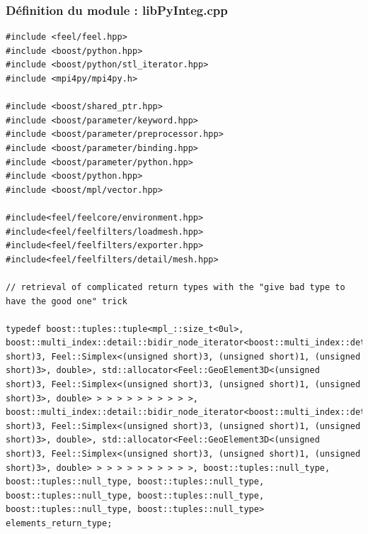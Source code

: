 \documentclass[french,12pt]{article}
\begin{document}
\subsubsection{Définition du module : libPyInteg.cpp}
\begin{lstlisting}
#include <feel/feel.hpp>
#include <boost/python.hpp>
#include <boost/python/stl_iterator.hpp>
#include <mpi4py/mpi4py.h>

#include <boost/shared_ptr.hpp>
#include <boost/parameter/keyword.hpp>
#include <boost/parameter/preprocessor.hpp>
#include <boost/parameter/binding.hpp>
#include <boost/parameter/python.hpp>
#include <boost/python.hpp>
#include <boost/mpl/vector.hpp>

#include<feel/feelcore/environment.hpp>
#include<feel/feelfilters/loadmesh.hpp>
#include<feel/feelfilters/exporter.hpp>
#include<feel/feelfilters/detail/mesh.hpp>

// retrieval of complicated return types with the "give bad type to have the good one" trick  

typedef boost::tuples::tuple<mpl_::size_t<0ul>, boost::multi_index::detail::bidir_node_iterator<boost::multi_index::detail::ordered_index_node<boost::multi_index::detail::ordered_index_node<boost::multi_index::detail::ordered_index_node<boost::multi_index::detail::ordered_index_node<boost::multi_index::detail::ordered_index_node<boost::multi_index::detail::ordered_index_node<boost::multi_index::detail::ordered_index_node<boost::multi_index::detail::index_node_base<Feel::GeoElement3D<(unsigned short)3, Feel::Simplex<(unsigned short)3, (unsigned short)1, (unsigned short)3>, double>, std::allocator<Feel::GeoElement3D<(unsigned short)3, Feel::Simplex<(unsigned short)3, (unsigned short)1, (unsigned short)3>, double> > > > > > > > > > >, boost::multi_index::detail::bidir_node_iterator<boost::multi_index::detail::ordered_index_node<boost::multi_index::detail::ordered_index_node<boost::multi_index::detail::ordered_index_node<boost::multi_index::detail::ordered_index_node<boost::multi_index::detail::ordered_index_node<boost::multi_index::detail::ordered_index_node<boost::multi_index::detail::ordered_index_node<boost::multi_index::detail::index_node_base<Feel::GeoElement3D<(unsigned short)3, Feel::Simplex<(unsigned short)3, (unsigned short)1, (unsigned short)3>, double>, std::allocator<Feel::GeoElement3D<(unsigned short)3, Feel::Simplex<(unsigned short)3, (unsigned short)1, (unsigned short)3>, double> > > > > > > > > > >, boost::tuples::null_type, boost::tuples::null_type, boost::tuples::null_type, boost::tuples::null_type, boost::tuples::null_type, boost::tuples::null_type, boost::tuples::null_type> elements_return_type; 


\end{lstlisting}
\end{document}
